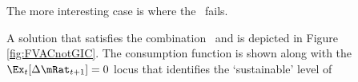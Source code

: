 The more interesting case is where the \GICNrm~fails.

A solution that satisfies the combination \FVAC~and
\cncl{\GICNrm} is depicted in Figure \ref{fig:FVACnotGIC}.  The
consumption function is shown along with the $\Ex_{t}[\Delta
\mRat_{t+1}]=0$ locus that identifies the `sustainable' level of
